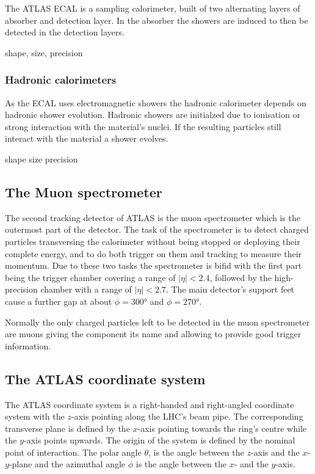 The ATLAS ECAL is a sampling calorimeter, built of two alternating layers of absorber and detection layer. In the absorber the showers are induced to then be detected in the detection layers.

shape, size, precision


\subsubsection{Hadronic calorimeters}

As the ECAL uses electromagnetic showers the hadronic calorimeter depends on hadronic shower evolution. Hadronic showers are initialzed due to ionisation or strong interaction with the material's nuclei. If the resulting particles still interact with the material a shower evolves.

shape size precision

\subsection{The Muon spectrometer}

The second tracking detector of ATLAS is the muon spectrometer which is the outermost part of the detector. The task of the spectrometer is to detect charged particles transversing the calorimeter without being stopped or deploying their complete energy, and to do both trigger on them and tracking to measure their momentum. Due to these two tasks the spectrometer is bifid with the first part being the trigger chamber covering a range of $|\eta|<2.4$, followed by the high-precision chamber with a range of $|\eta|<2.7$. The main detector's support feet cause a further gap at about $\phi = \ang{300}$ and $\phi = \ang{270}$.

Normally the only charged particles left to be detected in the muon spectrometer are muons giving the component its name and allowing to provide good trigger information.




\subsection{The ATLAS coordinate system}

The ATLAS coordinate system is a right-handed and right-angled coordinate system with the $z$-axis pointing along the LHC's beam pipe. The corresponding transverse plane is defined by the $x$-axis pointing towards the ring's centre while the $y$-axis points upwards. The origin of the system is defined by the nominal point of interaction. The polar angle $\theta$, is the angle between the $z$-axis and the $x$-$y$-plane and the azimuthal angle $\phi$ is the angle between the $x$- and the $y$-axis.

